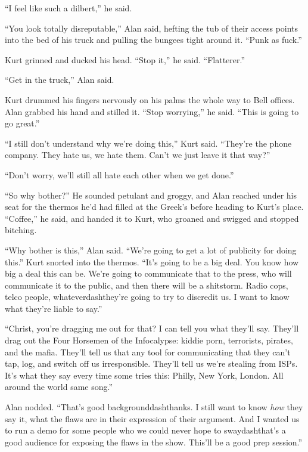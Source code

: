 ``I feel like such a dilbert,'' he said.

``You look totally disreputable,'' Alan said, hefting the tub of their
access points into the bed of his truck and pulling the bungees tight
around it.  ``Punk as fuck.''

Kurt grinned and ducked his head.  ``Stop it,'' he said. 
``Flatterer.''

``Get in the truck,'' Alan said.

Kurt drummed his fingers nervously on his palms the whole way to Bell
offices.  Alan grabbed his hand and stilled it.  ``Stop worrying,'' he
said.  ``This is going to go great.''

``I still don't understand why we're doing this,'' Kurt said. 
``They're the phone company.  They hate us, we hate them.  Can't we
just leave it that way?''

``Don't worry, we'll still all hate each other when we get done.''

``So why bother?'' He sounded petulant and groggy, and Alan reached
under his seat for the thermos he'd had filled at the Greek's before
heading to Kurt's place.  ``Coffee,'' he said, and handed it to Kurt,
who groaned and swigged and stopped bitching.

``Why bother is this,'' Alan said.  ``We're going to get a lot of
publicity for doing this.'' Kurt snorted into the thermos.  ``It's
going to be a big deal.  You know how big a deal this can be.  We're
going to communicate that to the press, who will communicate it to the
public, and then there will be a shitstorm.  Radio cops, telco people,
whateverdash{}they're going to try to discredit us.  I want to know what
they're liable to say.''

``Christ, you're dragging me out for that?  I can tell you what
they'll say.  They'll drag out the Four Horsemen of the Infocalypse: 
kiddie porn, terrorists, pirates, and the mafia.  They'll tell us that
any tool for communicating that they can't tap, log, and switch off us
irresponsible.  They'll tell us we're stealing from ISPs.  It's what
they say every time some tries this:  Philly, New York, London.  All
around the world same song.''

Alan nodded.  ``That's good backgrounddash{}thanks.  I still want to know
\textit{how} they say it, what the flaws are in their expression of
their argument.  And I wanted us to run a demo for some people who we
could never hope to swaydash{}that's a good audience for exposing the
flaws in the show.  This'll be a good prep session.''

